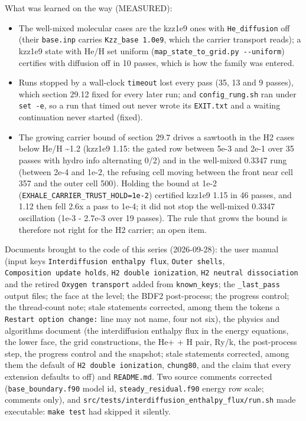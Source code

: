 \documentclass[english,a4paper]{my_memo}
\providecommand{\tightlist}{\setlength{\itemsep}{0pt}\setlength{\parskip}{0pt}}
\begin{document}
What was learned on the way (MEASURED):

\begin{itemize}
\tightlist
\item
  The well-mixed molecular cases are the kzz1e9 ones with \texttt{He\_diffusion}
  off (their \texttt{base.inp} carries \texttt{Kzz\_base\ 1.0e9}, which the carrier
  transport reads); a kzz1e9 state with He/H set uniform
  (\texttt{map\_state\_to\_grid.py\ -\/-uniform}) certifies with diffusion off in 10
  passes, which is how the family was entered.
\item
  Runs stopped by a wall-clock \texttt{timeout} lost every pass (35, 13 and 9
  passes), which section 29.12 fixed for every later run; and
  \texttt{config\_rung.sh} ran under \texttt{set\ -e}, so a run that timed out never wrote
  its \texttt{EXIT.txt} and a waiting continuation never started (fixed).
\item
  The growing carrier bound of section 29.7 drives a sawtooth in the H2
  cases below He/H \textasciitilde1.2 (kzz1e9 1.15: the gated row between 5e-3 and 2e-1
  over 35 passes with hydro info alternating 0/2) and in the well-mixed
  0.3347 rung (between 2e-4 and 1e-2, the refusing cell moving between the
  front near cell 357 and the outer cell 500). Holding the bound at 1e-2
  (\texttt{EXHALE\_CARRIER\_TRUST\_HOLD=1e-2}) certified kzz1e9 1.15 in 46 passes, and
  1.12 then fell 2.6x a pass to 1e-4; it did not stop the well-mixed 0.3347
  oscillation (1e-3 - 2.7e-3 over 19 passes). The rule that grows the bound
  is therefore not right for the H2 carrier; an open item.
\end{itemize}

Documents brought to the code of this series (2026-09-28): the user manual
(input keys \texttt{Interdiffusion\ enthalpy\ flux}, \texttt{Outer\ shells}, \texttt{Composition\ update\ holds}, \texttt{H2\ double\ ionization}, \texttt{H2\ neutral\ dissociation} and the
retired \texttt{Oxygen\ transport} added from \texttt{known\_keys}; the \texttt{\_last\_pass} output
files; the face at the level; the BDF2 post-process; the progress control;
the thread-count note; stale statements corrected, among them the tokens a
\texttt{Restart\ option\ change:} line may not name, four not six), the physics and
algorithms document (the interdiffusion enthalpy flux in the energy
equations, the lower face, the grid constructions, the He+ + H pair, Ry/k,
the post-process step, the progress control and the snapshot; stale
statements corrected, among them the default of \texttt{H2\ double\ ionization},
\texttt{chung80}, and the claim that every extension defaults to off) and
\texttt{README.md}. Two source comments corrected (\texttt{base\_boundary.f90} model id,
\texttt{steady\_residual.f90} energy row scale; comments only), and
\texttt{src/tests/interdiffusion\_enthalpy\_flux/run.sh} made executable: \texttt{make\ test}
had skipped it silently.
\end{document}
